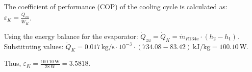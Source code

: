 The coefficient of performance (COP) of the cooling cycle is calculated as:  
\( \varepsilon_K = \frac{\dot{Q}_{zu}}{\dot{W}_K} \).  

Using the energy balance for the evaporator:  
\( \dot{Q}_{zu} = \dot{Q}_K = \dot{m}_{R134a} \cdot (h_2 - h_1) \).  
Substituting values:  
\( \dot{Q}_K = 0.017 \, \text{kg/s} \cdot 10^{-3} \cdot (734.08 - 83.42) \, \text{kJ/kg} = 100.10 \, \text{W} \).  

Thus, \( \varepsilon_K = \frac{100.10 \, \text{W}}{28 \, \text{W}} = 3.5818 \).